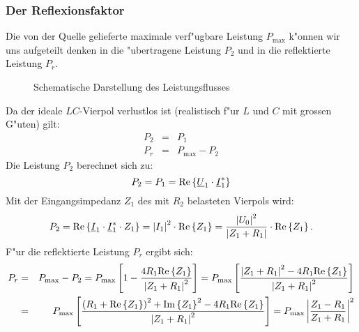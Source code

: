 \subsubsection{Der Reflexionsfaktor}
Die von der Quelle gelieferte maximale verf"ugbare
Leistung $P_{\max}$ k"onnen wir uns aufgeteilt denken in die
"ubertragene Leistung $P_2$ und in die reflektierte Leistung $P_r$.
\begin{figure}[!htb]
\begin{center}
  \caption{Schematische Darstellung des Leistungsflusses}
\end{center}
\vspace*{-6mm}
\end{figure}
Da der ideale $LC$-Vierpol verlustlos ist (realistisch f"ur $L$ und $C$ mit
grossen G"uten) gilt:
\begin{eqnarray}
P_2 &=& P_1\\
P_r &=& P_{\max}-P_2
\end{eqnarray}
Die Leistung $P_2$ berechnet sich zu:
\begin{equation}
P_2=P_1={\rm Re} \left\{ \underline{U}_1 \cdot \underline{I}_1^* \right\}
\end{equation}
Mit der Eingangsimpedanz $Z_1$ des mit $R_2$ belasteten Vierpols wird:
\begin{equation*}
P_2={\rm Re} \left\{ \underline{I}_1 \cdot \underline{I}_1^* 
                       \cdot Z_1 \right\} 
=\left| I_1 \right|^2 \cdot {\rm Re} \left\{ Z_1 \right\} 
=\frac{\left| U_0 \right|^2 }{\left| Z_1 + R_1 \right| }
      \cdot {\rm Re} \left\{ Z_1 \right\}.
\end{equation*}
\nit F"ur die reflektierte Leistung $P_r$ ergibt sich:
\begin{eqnarray}
P_r &=& P_{\max}-P_2=
        P_{\max} \left[ 1-\frac{4 R_1 {\rm Re} \left\{ Z_1 \right\}}
                               {\left| Z_1 + R_1 \right|^2} \right]=P_{\max} \left[ \frac{\left| Z_1 + R_1 \right|^2 -
                         4 R_1 {\rm Re} \left\{ Z_1 \right\}}
                        {\left| Z_1 + R_1 \right|^2} \right] \nonumber \\
&=& P_{\max} \left[ \frac{\left( R_1 + {\rm Re} \left\{ Z_1 \right\} \right)^2
                         + {\rm Im} \left\{ Z_1 \right\}^2
                        -4 R_1 {\rm Re} \left\{ Z_1 \right\}}
                        {\left| Z_1 + R_1 \right|^2} \right]=P_{\max} \left| \frac{Z_1-R_1}{Z_1 + R_1} \right|^2\nonumber
\end{eqnarray}\\~~\\

